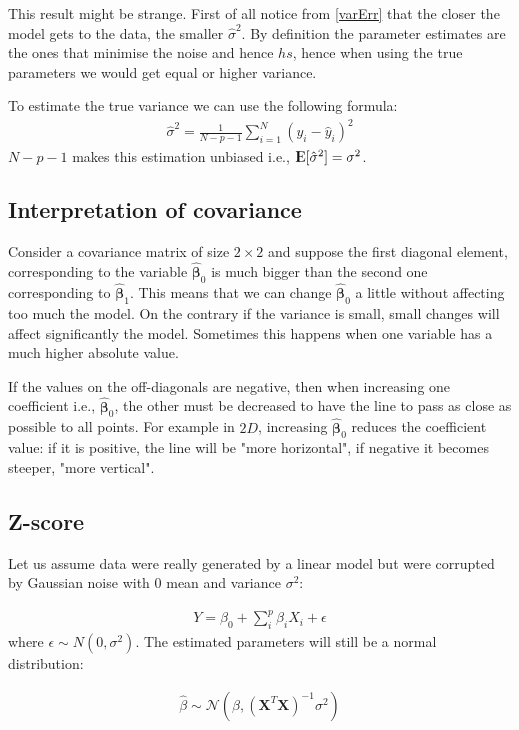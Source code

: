 \documentclass[12pt, letterpaper]{article}
\theoremstyle{definition}
\newcommand{\E}{{\rm I\kern-.3em E}}
\newcommand{\X}{\mathrm{\mathbf{X}}}
\newcommand{\hs}{\hat{\sigma}^2}
\newcommand{\hb}{\mathrm{\hat{\mathbf{\beta}}}}
\begin{document}
This result might be strange. First of all notice from \ref{varErr} that the closer the model gets to the data, the smaller $\hs$. By definition the parameter estimates are the ones that minimise the noise and hence $hs$, hence when using the true parameters we would get equal or higher variance.

To estimate the true variance we can use the following formula:
\begin{align}
\hat{\sigma}^2 = \frac{1}{N-p-1}\sum_{i=1}^{N}(y_i-\hat{y}_i)^2
\end{align}
$N-p-1$ makes this estimation unbiased i.e., $\E[\hat{\sigma}^2] =\sigma^2$.

\subsection{Interpretation of covariance}
Consider a covariance matrix of size $2\times 2$ and suppose the first diagonal element, corresponding to the variable $\hb_0$ is much bigger than the second one corresponding to $\hb_1$. This means that we can change $\hb_0$ a little without affecting too much the model. On the contrary if the variance is small, small changes will affect significantly the model. Sometimes this happens when one variable has a much higher absolute value.

If the values on the off-diagonals are negative, then when increasing one coefficient i.e., $\hb_0$, the other must be decreased to have the line to pass as close as possible to all points. For example in $2D$, increasing $\hb_0$ reduces the coefficient value: if it is positive, the line will be "more horizontal", if negative it becomes steeper, "more vertical".
\subsection{Z-score}
Let us assume data were really generated by a linear model but were corrupted by Gaussian noise with $0$ mean and variance $\sigma^2$:

\begin{align}
Y = \beta_0 +\sum_i^p \beta_i X_i + \epsilon
\end{align} 
where $\epsilon \sim N(0,\sigma^2)$.
The estimated parameters will still be a normal distribution:

\begin{align}
\label{parameterVar}
\hat{\beta} \sim \mathcal{N}(\beta,  (\X^T\X)^{-1} \sigma^2)
\end{align}
\end{document}
